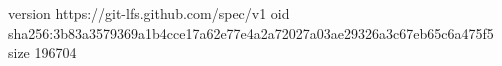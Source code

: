 version https://git-lfs.github.com/spec/v1
oid sha256:3b83a3579369a1b4cce17a62e77e4a2a72027a03ae29326a3c67eb65c6a475f5
size 196704
